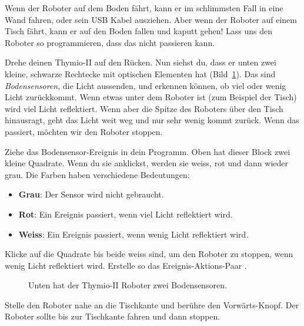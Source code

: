 Wenn der Roboter auf dem Boden fährt, kann er im schlimmsten Fall in eine Wand
fahren, oder sein USB Kabel ausziehen. Aber wenn der Roboter auf einem Tisch
fährt, kann er auf den Boden fallen und kaputt gehen! Lass uns den Roboter so
programmieren, dass das nicht passieren kann.


Drehe deinen Thymio-II auf den Rücken. Nun siehst du, dass er unten zwei
kleine, schwarze Rechtecke mit optischen Elementen hat (Bild~\ref{fig.bottom}).
Das sind \emph{Bodensensoren}, die Licht aussenden, und erkennen können, ob
viel oder wenig Licht zurückkommt. Wenn etwas unter dem Roboter ist (zum
Beispiel der Tisch) wird viel Licht reflektiert. Wenn aber die Spitze des
Roboters über den Tisch hinausragt, geht das Licht weit weg und nur sehr wenig
kommt zurück. Wenn das passiert, möchten wir den Roboter stoppen.


Ziehe das Bodensensor-Ereignis  in dein Programm. Oben hat
dieser Block zwei kleine Quadrate. Wenn du sie anklickst, werden sie weiss, rot
und dann wieder grau. Die Farben haben verschiedene Bedeutungen:

\begin{itemize}
\item \textbf{Grau}: Der Sensor wird nicht gebraucht.
\item \textbf{Rot}: Ein Ereignis passiert, wenn viel Licht reflektiert wird.
\item \textbf{Weiss}: Ein Ereignis passiert, wenn wenig Licht reflektiert wird. 
\end{itemize}

Klicke auf die Quadrate bis beide weiss sind, um den Roboter zu stoppen, wenn
wenig Licht reflektiert wird. Erstelle so das Ereignis-Aktions-Paar
.

\begin{figure}
\begin{center}
\caption{Unten hat der Thymio-II Roboter zwei Bodensensoren.}\label{fig.bottom}
\end{center}
\end{figure}

Stelle den Roboter nahe an die Tischkante und berühre den Vorwärts-Knopf. Der
Roboter sollte bis zur Tischkante fahren und dann stoppen.

